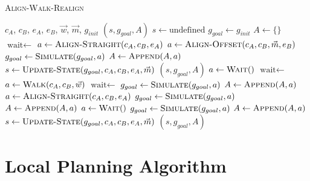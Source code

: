 \begin{algorithm}
	\caption{\scshape Align-Walk-Realign}
	\label{algo:local_algo}
	\begin{algorithmic}[1]
		\REQUIRE $c_A$, $c_B$, $e_A$, $e_B$, $\vec{w}$, $\vec{m}$, $g_{init}$ 
		\ENSURE $(s, g_{goal}, A)$ 
		\STATE $s \gets \text{undefined}$
		\STATE $g_{goal} \gets g_{init}$
		\STATE $A \gets \{\}$
		\STATE $\text{wait} \gets$ \TRUE
		\LOOP
				\STATE $a \gets \text{\scshape Align-Straight}(c_A, c_B, e_A)$
			\ELSE
				\STATE $a \gets \text{\scshape Align-Offset}(c_A, c_B, \vec{m}, e_B)$
			\ENDIF
			\STATE $g_{goal} \gets \text{\scshape Simulate}(g_{goal}, a)$
			\STATE $A \gets \text{\scshape Append}(A, a)$
			\STATE $s \gets \text{\scshape Update-State}(g_{goal}, c_A, c_B, e_A, \vec{m})$
				\RETURN $(s, g_{goal}, A)$
			\ENDIF
				\STATE $a \gets \text{\scshape Wait}()$
				\STATE $\text{wait} \gets$ \FALSE
			\ELSE
				\STATE $a \gets \text{\scshape Walk}(c_A, c_B, \vec{w})$ 
				\STATE $\text{wait} \gets$ \TRUE
			\ENDIF
			\STATE $g_{goal} \gets \text{\scshape Simulate}(g_{goal}, a)$
			\STATE $A \gets \text{\scshape Append}(A, a)$
				\STATE $a \gets \text{\scshape Align-Straight}(c_A, c_B, e_A)$ 
				\STATE $g_{goal} \gets \text{\scshape Simulate}(g_{goal}, a)$
				\STATE $A \gets \text{\scshape Append}(A, a)$
					\STATE $a \gets \text{\scshape Wait}()$
					\STATE $g_{goal} \gets \text{\scshape Simulate}(g_{goal}, a)$
					\STATE $A \gets \text{\scshape Append}(A, a)$
				\ENDWHILE
			\ENDIF
			\STATE $s \gets \text{\scshape Update-State}(g_{goal}, c_A, c_B, e_A, \vec{m})$
				\RETURN $(s, g_{goal}, A)$
			\ENDIF
		\ENDLOOP 
	\end{algorithmic}
\end{algorithm}

\section{Local Planning Algorithm}
\label{sec:local_algo}


